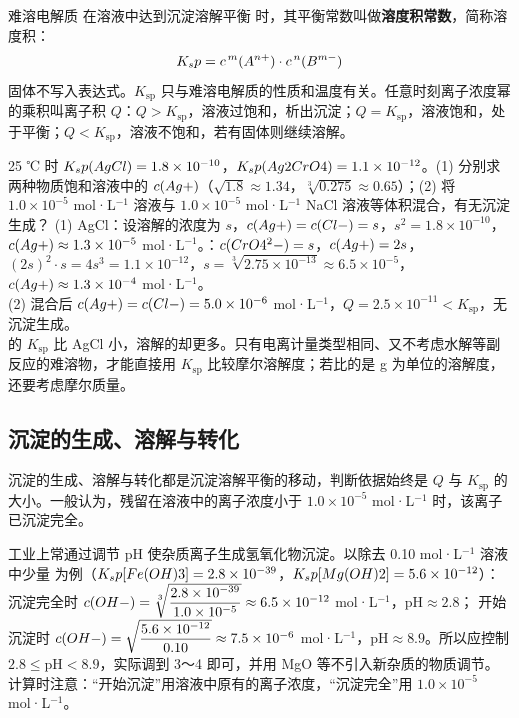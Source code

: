 \begin{gainian}[溶度积]
难溶电解质  在溶液中达到沉淀溶解平衡  时，其平衡常数叫做\textbf{溶度积常数}，简称溶度积：
\[K_sp=c^{\,m}(A^{n+})\cdot c^{\,n}(B^{m-})\]
固体不写入表达式。$K_\text{sp}$ 只与难溶电解质的性质和温度有关。任意时刻离子浓度幂的乘积叫离子积 $Q$：$Q>K_\text{sp}$，溶液过饱和，析出沉淀；$Q=K_\text{sp}$，溶液饱和，处于平衡；$Q<K_\text{sp}$，溶液不饱和，若有固体则继续溶解。
\end{gainian}

\begin{liti}[基础]
25 ℃ 时 $K_sp(AgCl)=1.8\times10^{-10}$，$K_sp(Ag2CrO4)=1.1\times10^{-12}$。(1) 分别求两种物质饱和溶液中的 $c(Ag+)$（$\sqrt{1.8}\approx1.34$，$\sqrt[3]{0.275}\approx0.65$）；(2) 将 $1.0\times10^{-5}$ mol·L$^{-1}$  溶液与 $1.0\times10^{-5}$ mol·L$^{-1}$ NaCl 溶液等体积混合，有无沉淀生成？
\tcblower
\jie (1) AgCl：设溶解的浓度为 $s$，$c(Ag+)=c(Cl-)=s$，$s^2=1.8\times10^{-10}$，$c(Ag+)\approx1.3\times10^{-5}$ mol·L$^{-1}$。：$c(CrO4^2-)=s$，$c(Ag+)=2s$，$(2s)^2\cdot s=4s^3=1.1\times10^{-12}$，$s=\sqrt[3]{2.75\times10^{-13}}\approx6.5\times10^{-5}$，$c(Ag+)\approx1.3\times10^{-4}$ mol·L$^{-1}$。\\
(2) 混合后 $c(Ag+)=c(Cl-)=5.0\times10^{-6}$ mol·L$^{-1}$，$Q=2.5\times10^{-11}<K_\text{sp}$，无沉淀生成。\\
\dianbo {} 的 $K_\text{sp}$ 比 AgCl 小，溶解的却更多。只有电离计量类型相同、又不考虑水解等副反应的难溶物，才能直接用 $K_\text{sp}$ 比较摩尔溶解度；若比的是 g 为单位的溶解度，还要考虑摩尔质量。
\end{liti}

\subsection{沉淀的生成、溶解与转化}
沉淀的生成、溶解与转化都是沉淀溶解平衡的移动，判断依据始终是 $Q$ 与 $K_\text{sp}$ 的大小。一般认为，残留在溶液中的离子浓度小于 $1.0\times10^{-5}$ mol·L$^{-1}$ 时，该离子已沉淀完全。

工业上常通过调节 pH 使杂质离子生成氢氧化物沉淀。以除去 0.10 mol·L$^{-1}$  溶液中少量  为例（$K_sp[Fe(OH)3]=2.8\times10^{-39}$，$K_sp[Mg(OH)2]=5.6\times10^{-12}$）： 沉淀完全时 $c(OH-)=\sqrt[3]{\dfrac{2.8\times10^{-39}}{1.0\times10^{-5}}}\approx6.5\times10^{-12}$ mol·L$^{-1}$，pH$\approx2.8$； 开始沉淀时 $c(OH-)=\sqrt{\dfrac{5.6\times10^{-12}}{0.10}}\approx7.5\times10^{-6}$ mol·L$^{-1}$，pH$\approx8.9$。所以应控制 $2.8\le\text{pH}<8.9$，实际调到 3～4 即可，并用 MgO 等不引入新杂质的物质调节。计算时注意：“开始沉淀”用溶液中原有的离子浓度，“沉淀完全”用 $1.0\times10^{-5}$ mol·L$^{-1}$。

